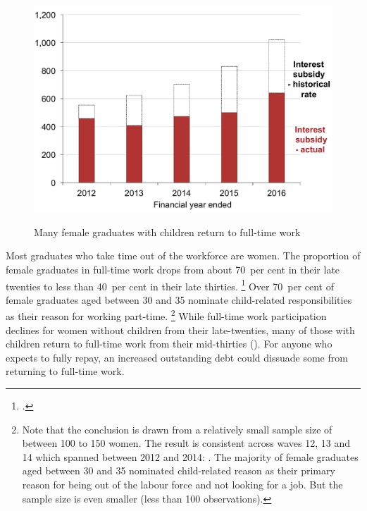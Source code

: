 \documentclass[embargoed]{grattan}
\begin{document}
\begin{figure}[t]\vspace{1pt}
\caption{Many female graduates with children return to full-time work}\label{fig:fig16-many-female-grads-with-children-return-to-full-time-work}


\includegraphics[page=16]{atlas/Chartpack.pdf}

{\textcite{ABS2012Censuspopulationhousing}}
\end{figure}

Most graduates who take time out of the workforce are women.
The proportion of female graduates in full-time work drops from about 70~per cent in their late twenties to less than 40~per cent in their late thirties.%
\footcite[][Figure~9]{Norton2016HELPfuturefairer} %
Over 70~per cent of female graduates aged between 30 and 35 nominate child-related responsibilities as their reason for working part-time.%
\footnote{Note that the conclusion is drawn from a relatively small sample size of between 100 to 150 women.
The result is consistent across waves 12, 13 and 14 which spanned between 2012 and 2014: \textcite{HILDA2015HouseholdIncomeLabour}.
The majority of female graduates aged between 30 and 35 nominated child-related reason as their primary reason for being out of the labour force and not looking for a job.
But the sample size is even smaller (less than 100 observations).} 
While full-time work participation declines for women without children from their late-twenties, many of those with children return to full-time work from their mid-thirties ().
For anyone who expects to fully repay, an increased outstanding debt could dissuade some from returning to full-time work.
\end{document}
